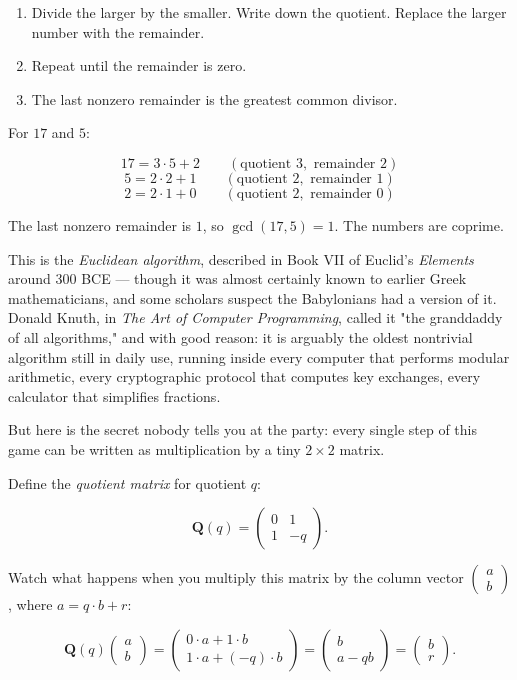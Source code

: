 \begin{enumerate}
\item Divide the larger by the smaller. Write down the quotient. Replace the larger number with the remainder.
\item Repeat until the remainder is zero.
\item The last nonzero remainder is the greatest common divisor.
\end{enumerate}
For $17$ and $5$:

\[
17 = 3 \cdot 5 + 2 \qquad (\text{quotient } 3, \text{ remainder } 2)
\]
\[
5 = 2 \cdot 2 + 1 \qquad (\text{quotient } 2, \text{ remainder } 1)
\]
\[
2 = 2 \cdot 1 + 0 \qquad (\text{quotient } 2, \text{ remainder } 0)
\]

The last nonzero remainder is $1$, so $\gcd(17, 5) = 1$. The numbers are coprime.

This is the \textit{Euclidean algorithm}, described in Book VII of Euclid's \textit{Elements} around 300 BCE --- though it was almost certainly known to earlier Greek mathematicians, and some scholars suspect the Babylonians had a version of it. Donald Knuth, in \textit{The Art of Computer Programming}, called it "the granddaddy of all algorithms," and with good reason: it is arguably the oldest nontrivial algorithm still in daily use, running inside every computer that performs modular arithmetic, every cryptographic protocol that computes key exchanges, every calculator that simplifies fractions.

But here is the secret nobody tells you at the party: every single step of this game can be written as multiplication by a tiny $2 \times 2$ matrix.

Define the \textit{quotient matrix} for quotient $q$:

\[
\mathbf{Q}(q) = \begin{pmatrix} 0 & 1 \\ 1 & -q \end{pmatrix}.
\]

Watch what happens when you multiply this matrix by the column vector $\begin{pmatrix} a \\ b \end{pmatrix}$, where $a = q \cdot b + r$:

\[
\mathbf{Q}(q) \begin{pmatrix} a \\ b \end{pmatrix} = \begin{pmatrix} 0 \cdot a + 1 \cdot b \\ 1 \cdot a + (-q) \cdot b \end{pmatrix} = \begin{pmatrix} b \\ a - qb \end{pmatrix} = \begin{pmatrix} b \\ r \end{pmatrix}.
\]

